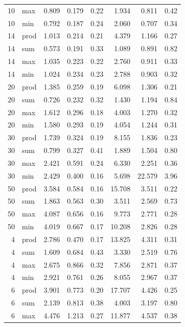 \documentclass[11pt]{article}
\begin{document}
\begin{table}[H]
\begin{tabular}{@{}rlrrrrrr@{}}
        10 & max & 0.809 & 0.179 & 0.22 & 1.934 & 0.811 & 0.42 \\
        10 & min & 0.792 & 0.187 & 0.24 & 2.060 & 0.707 & 0.34 \\
        14 & prod & 1.013 & 0.214 & 0.21 & 4.379 & 1.166 & 0.27 \\
        14 & sum & 0.573 & 0.191 & 0.33 & 1.089 & 0.891 & 0.82 \\
        14 & max & 1.035 & 0.223 & 0.22 & 2.760 & 0.911 & 0.33 \\
        14 & min & 1.024 & 0.234 & 0.23 & 2.788 & 0.903 & 0.32 \\
        20 & prod & 1.385 & 0.259 & 0.19 & 6.098 & 1.306 & 0.21 \\
        20 & sum & 0.726 & 0.232 & 0.32 & 1.430 & 1.194 & 0.84 \\
        20 & max & 1.612 & 0.296 & 0.18 & 4.003 & 1.270 & 0.32 \\
        20 & min & 1.580 & 0.293 & 0.19 & 4.054 & 1.244 & 0.31 \\
        30 & prod & 1.739 & 0.324 & 0.19 & 8.155 & 1.836 & 0.23 \\
        30 & sum & 0.799 & 0.327 & 0.41 & 1.889 & 1.504 & 0.80 \\
        30 & max & 2.421 & 0.591 & 0.24 & 6.330 & 2.251 & 0.36 \\
        30 & min & 2.429 & 0.400 & 0.16 & 5.698 & 22.579 & 3.96 \\
        50 & prod & 3.584 & 0.584 & 0.16 & 15.708 & 3.511 & 0.22 \\
        50 & sum & 1.863 & 0.563 & 0.30 & 3.511 & 2.569 & 0.73 \\
        50 & max & 4.087 & 0.656 & 0.16 & 9.773 & 2.771 & 0.28 \\
        50 & min & 4.019 & 0.667 & 0.17 & 10.208 & 2.826 & 0.28 \\
        4 & prod & 2.786 & 0.470 & 0.17 & 13.825 & 4.311 & 0.31 \\
        4 & sum & 1.609 & 0.684 & 0.43 & 3.330 & 2.519 & 0.76 \\
        4 & max & 2.675 & 0.866 & 0.32 & 7.856 & 2.871 & 0.37 \\
        4 & min & 2.921 & 0.761 & 0.26 & 8.055 & 2.967 & 0.37 \\
        6 & prod & 3.901 & 0.773 & 0.20 & 17.707 & 4.426 & 0.25 \\
        6 & sum & 2.139 & 0.813 & 0.38 & 4.003 & 3.197 & 0.80 \\
        6 & max & 4.476 & 1.213 & 0.27 & 11.877 & 4.537 & 0.38 \\

\end{tabular}
\end{table}
\end{document}
